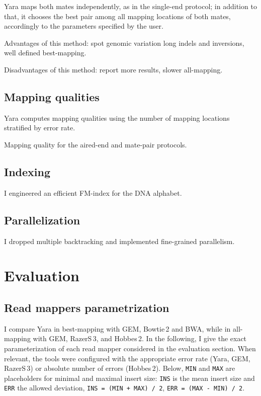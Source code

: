 Yara maps both mates independently, as in the single-end protocol; in addition to that, it chooses the best pair among all mapping locations of both mates, accordingly to the parameters specified by the user.

Advantages of this method: spot genomic variation \eg long indels and inversions, well defined best-mapping.

Disadvantages of this method: report more results, slower all-mapping.

\subsection{Mapping qualities}

Yara computes mapping qualities using the number of mapping locations stratified by error rate.

Mapping quality for the aired-end and mate-pair protocols.

\subsection{Indexing}

I engineered an efficient FM-index for the DNA alphabet.

\subsection{Parallelization}

I dropped multiple backtracking and implemented fine-grained parallelism.



\section{Evaluation}

\subsection{Read mappers parametrization}

I compare Yara in best-mapping with GEM, Bowtie\,2 and BWA, while in all-mapping with GEM, RazerS\,3, and Hobbes\,2.
In the following, I give the exact parameterization of each read mapper considered in the evaluation section.
When relevant, the tools were configured with the appropriate error rate (Yara, GEM, RazerS\,3) or absolute number of errors (Hobbes\,2).
Below, \texttt{MIN} and \texttt{MAX} are placeholders for minimal and maximal insert size: \texttt{INS} is the mean insert size and \texttt{ERR} the allowed deviation, \ie \texttt{INS = (MIN + MAX) / 2}, \texttt{ERR = (MAX - MIN) / 2}.

